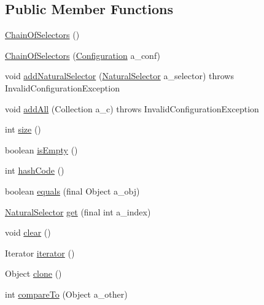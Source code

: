 \subsection*{Public Member Functions}
\begin{DoxyCompactItemize}
\item 
\hyperlink{classorg_1_1jgap_1_1impl_1_1_chain_of_selectors_a3dd0a6898224c13e3981faf074d6a63a}{Chain\-Of\-Selectors} ()
\item 
\hyperlink{classorg_1_1jgap_1_1impl_1_1_chain_of_selectors_a102d3ad23459e420d134ff241062d68e}{Chain\-Of\-Selectors} (\hyperlink{classorg_1_1jgap_1_1_configuration}{Configuration} a\-\_\-conf)
\item 
void \hyperlink{classorg_1_1jgap_1_1impl_1_1_chain_of_selectors_a7704efbd90e6e1749e85e9f53736806c}{add\-Natural\-Selector} (\hyperlink{classorg_1_1jgap_1_1_natural_selector}{Natural\-Selector} a\-\_\-selector)  throws Invalid\-Configuration\-Exception 
\item 
void \hyperlink{classorg_1_1jgap_1_1impl_1_1_chain_of_selectors_adc6c7eaa7c3daa0c13a81555642334a1}{add\-All} (Collection a\-\_\-c)  throws Invalid\-Configuration\-Exception 
\item 
int \hyperlink{classorg_1_1jgap_1_1impl_1_1_chain_of_selectors_a4588a14b0db4d503999c327ff7977a8b}{size} ()
\item 
boolean \hyperlink{classorg_1_1jgap_1_1impl_1_1_chain_of_selectors_a7a2654999e560f0c3977742b9d2a7809}{is\-Empty} ()
\item 
int \hyperlink{classorg_1_1jgap_1_1impl_1_1_chain_of_selectors_aed2b355ad6b2a322c554918ec6ef77ad}{hash\-Code} ()
\item 
boolean \hyperlink{classorg_1_1jgap_1_1impl_1_1_chain_of_selectors_ab75576d0847bf1e877f50c9c9149f3a8}{equals} (final Object a\-\_\-obj)
\item 
\hyperlink{classorg_1_1jgap_1_1_natural_selector}{Natural\-Selector} \hyperlink{classorg_1_1jgap_1_1impl_1_1_chain_of_selectors_ae558a4530b64654da843bcd72fb7d24a}{get} (final int a\-\_\-index)
\item 
void \hyperlink{classorg_1_1jgap_1_1impl_1_1_chain_of_selectors_a0a2a71015c12325c6027a5c049987a8b}{clear} ()
\item 
Iterator \hyperlink{classorg_1_1jgap_1_1impl_1_1_chain_of_selectors_a340450dda72db3319b3896cdcaebb7d6}{iterator} ()
\item 
Object \hyperlink{classorg_1_1jgap_1_1impl_1_1_chain_of_selectors_a81b45967844c2ac4484f9c06113037dc}{clone} ()
\item 
int \hyperlink{classorg_1_1jgap_1_1impl_1_1_chain_of_selectors_a63d1fc9e64182d363504c191bd7f9d83}{compare\-To} (Object a\-\_\-other)
\end{DoxyCompactItemize}
